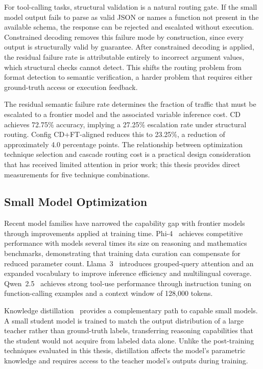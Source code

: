 For tool-calling tasks, structural validation is a natural routing
gate. If the small model output fails to parse as valid JSON or names
a function not present in the available schema, the response can be
rejected and escalated without execution. Constrained decoding removes
this failure mode by construction, since every output is
structurally valid by guarantee. After constrained decoding is
applied, the residual failure rate is attributable entirely to
incorrect argument values, which structural checks cannot detect.
This shifts the routing problem from format detection to semantic
verification, a harder problem that requires either ground-truth
access or execution feedback.

The residual semantic failure rate determines the fraction of traffic
that must be escalated to a frontier model and the associated
variable inference cost. CD achieves 72.75\% accuracy,
implying a 27.25\% escalation rate under structural routing. Config
CD+FT-aligned reduces this to 23.25\%, a reduction of approximately
4.0 percentage points. The relationship between optimization
technique selection and cascade routing cost is a practical design
consideration that has received limited attention in prior work; this
thesis provides direct measurements for five technique combinations.

\subsection{Small Model Optimization}

Recent model families have narrowed the capability gap with frontier
models through improvements applied at training time. Phi-4~%
\cite{abdin2024phi} achieves competitive performance with models
several times its size on reasoning and mathematics benchmarks,
demonstrating that training data curation can compensate for reduced
parameter count. Llama~3~\cite{llama2024llama32} introduces
grouped-query attention and an expanded vocabulary to improve
inference efficiency and multilingual coverage.
Qwen~2.5~\cite{qwen2024qwen25} achieves strong tool-use performance
through instruction tuning on function-calling examples and a context
window of 128,000 tokens.

Knowledge distillation~\cite{hinton2015distilling} provides a
complementary path to capable small models. A small student model is
trained to match the output distribution of a large teacher rather
than ground-truth labels, transferring reasoning capabilities that
the student would not acquire from labeled data alone. Unlike the
post-training techniques evaluated in this thesis, distillation
affects the model's parametric knowledge and requires access to the
teacher model's outputs during training.

